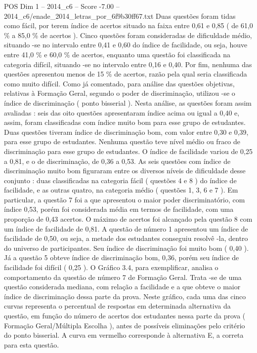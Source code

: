 \begin{textsample}{POS Dim 1 – 2014\_c6 – Score -7.00 – 2014\_c6/enade\_2014\_letras\_por\_6f9b30ff67.txt}
Duas questões foram tidas como fácil, por terem índice de acertos situado na faixa entre 0,61 e 0,85 ( de 61,0 \% a 85,0 \% de acertos ).
Cinco questões foram consideradas de dificuldade médio, situando -se no intervalo entre 0,41 e 0,60 do índice de facilidade, ou seja, houve entre 41,0 \% e 60,0 \% de acertos, enquanto uma questão foi classificada na categoria difícil, situando -se no intervalo entre 0,16 e 0,40.
Por fim, nenhuma das questões apresentou menos de 15 \% de acertos, razão pela qual seria classificada como muito difícil.
Como já comentado, para análise das questões objetivas, relativas à Formação Geral, segundo o poder de discriminação, utilizou -se o índice de discriminação ( ponto bisserial ).
Nesta análise, as questões foram assim avaliadas : seis das oito questões apresentaram índice acima ou igual a 0,40 e, assim, foram classificadas com índice muito bom para esse grupo de estudantes.
Duas questões tiveram índice de discriminação bom, com valor entre 0,30 e 0,39, para esse grupo de estudantes.
Nenhuma questão teve nível médio ou fraco de discriminação para esse grupo de estudantes.
O índice de facilidade variou de 0,25 a 0,81, e o de discriminação, de 0,36 a 0,53.
As seis questões com índice de discriminação muito bom figuraram entre os diversos níveis de dificuldade desse conjunto : duas classificadas na categoria fácil ( questões 4 e 8 ) do índice de facilidade, e as outras quatro, na categoria médio ( questões 1, 3, 6 e 7 ).
Em particular, a questão 7 foi a que apresentou o maior poder discriminatório, com índice 0,53, porém foi considerada média em termos de facilidade, com uma proporção de 0,43 acertos.
O máximo de acertos foi alcançado pela questão 8 com um índice de facilidade de 0,81.
A questão de número 1 apresentou um índice de facilidade de 0,50, ou seja, a metade dos estudantes conseguiu resolvê -la, dentro do universo de participantes.
Seu índice de discriminação foi muito bom ( 0,40 ).
Já a questão 5 obteve índice de discriminação bom, 0,36, porém seu índice de facilidade foi difícil ( 0,25 ).
O Gráfico 3.4, para exemplificar, analisa o comportamento da questão de número 7 de Formação Geral.
Trata -se de uma questão considerada mediana, com relação a facilidade e a que obteve o maior índice de discriminação dessa parte da prova.
Neste gráfico, cada uma das cinco curvas representa o percentual de respostas em determinada alternativa da questão, em função do número de acertos dos estudantes nessa parte da prova ( Formação Geral/Múltipla Escolha ), antes de possíveis eliminações pelo critério do ponto bisserial.
A curva em vermelho corresponde à alternativa E, a correta para esta questão.

\end{textsample}
